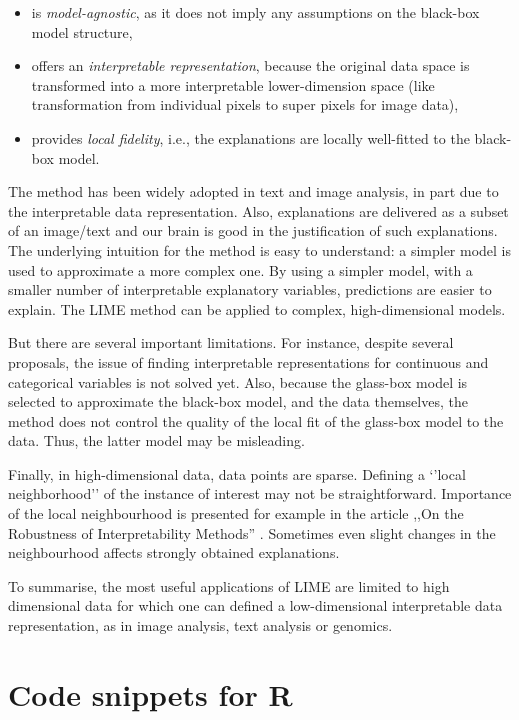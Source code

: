 \documentclass[]{krantz}
\providecommand{\tightlist}{%
  \setlength{\itemsep}{0pt}\setlength{\parskip}{0pt}}
\begin{document}
\begin{itemize}
\tightlist
\item
  is \emph{model-agnostic}, as it does not imply any assumptions on the black-box model structure,
\item
  offers an \emph{interpretable representation}, because the original data space is transformed into a more interpretable lower-dimension space (like transformation from individual pixels to super pixels for image data),
\item
  provides \emph{local fidelity}, i.e., the explanations are locally well-fitted to the black-box model.
\end{itemize}

The method has been widely adopted in text and image analysis, in part due to the interpretable data representation. Also, explanations are delivered as a subset of an image/text and our brain is good in the justification of such explanations. The underlying intuition for the method is easy to understand: a simpler model is used to approximate a more complex one. By using a simpler model, with a smaller number of interpretable explanatory variables, predictions are easier to explain. The LIME method can be applied to complex, high-dimensional models.

But there are several important limitations. For instance, despite several proposals, the issue of finding interpretable representations for continuous and categorical variables is not solved yet. Also, because the glass-box model is selected to approximate the black-box model, and the data themselves, the method does not control the quality of the local fit of the glass-box model to the data. Thus, the latter model may be misleading.

Finally, in high-dimensional data, data points are sparse. Defining a `'local neighborhood'' of the instance of interest may not be straightforward.
Importance of the local neighbourhood is presented for example in the article ,,On the Robustness of Interpretability Methods'' \citep{LIMESHAPstability}. Sometimes even slight changes in the neighbourhood affects strongly obtained explanations.

To summarise, the most useful applications of LIME are limited to high dimensional data for which one can defined a low-dimensional interpretable data representation, as in image analysis, text analysis or genomics.

\hypertarget{LIMERcode}{%
\section{Code snippets for R}\label{LIMERcode}}
\end{document}
